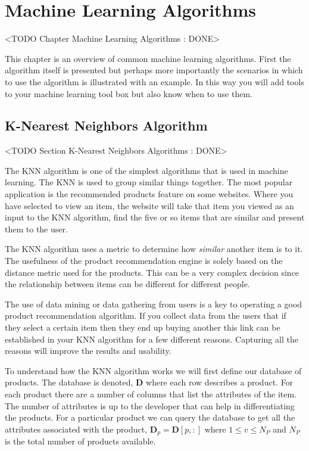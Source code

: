 \chapter{Machine Learning Algorithms}
	<TODO Chapter Machine Learning Algorithms : DONE>
	
This chapter is an overview of common machine learning algorithms. First the algorithm itself is presented but perhaps more importantly the scenarios in which to use the algorithm is illustrated with an example. In this way you will add tools to your machine learning tool box but also know when to use them. 

\section{K-Nearest Neighbors Algorithm}
	<TODO Section K-Nearest Neighbors Algorithms : DONE>
	
The \ac{KNN} algorithm is one of the simplest algorithms that is used in machine learning. The \ac{KNN} is used to group similar things together. The most popular application is the recommended products feature on some websites. Where you have selected to view an item, the website will take that item you viewed as an input to the \ac{KNN} algorithm, find the five or so items that are similar and present them to the user.

The \ac{KNN} algorithm uses a metric to determine how \emph{similar} another item is to it. The usefulness of the product recommendation engine is solely based on the distance metric used for the products. This can be a very complex decision since the relationship between items can be different for different people. 

The use of data mining or data gathering from users is a key to operating a good product recommendation algorithm. If you collect data from the users that if they select a certain item then they end up buying another this link can be established in your \ac{KNN} algorithm for a few different reasons. Capturing all the reasons will improve the results and usability.

To understand how the \ac{KNN} algorithm works we will first define our database of products. The database is denoted, $\mathbf{D}$ where each row describes a product. For each product there are a number of columns that list the attributes of the item. The number of attributes is up to the developer that can help in differentiating the products. For a particular product we can query the database to get all the attributes associated with the product, $\mathbf{D}_p = \mathbf{D}[p,:]$ where $1 \leq v \leq N_P$ and $N_P$ is the total number of products available.  

